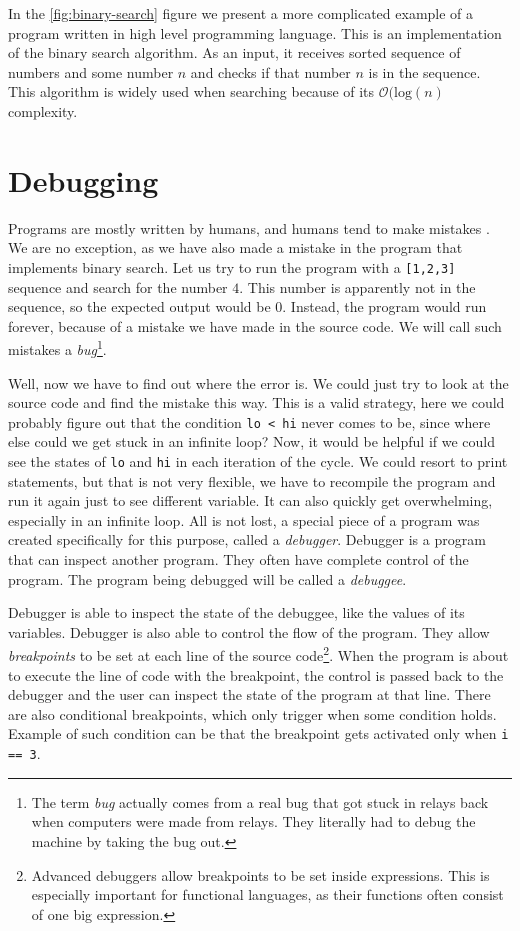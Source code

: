 In the \ref{fig:binary-search} figure we present a more complicated example of
a program written in high level programming language. This is an implementation
of the binary search algorithm. As an input, it receives sorted sequence of
numbers and some number $n$ and checks if that number $n$ is in the sequence.
This algorithm is widely used when searching because of its
$\mathcal{O}(\text{log}(n)$ complexity.

\section{Debugging}
Programs are mostly written by humans, and humans tend to make mistakes
\cite{human-error}. We are no exception, as we have also made a mistake in the
program that implements binary search. Let us try to run the program with a
\texttt{[1,2,3]} sequence and search for the number $4$. This number is
apparently not in the sequence, so the expected output would be $0$. Instead,
the program would run forever, because of a mistake we have made in the source
code. We will call such mistakes a \textit{bug}\footnote{The term \textit{bug}
actually comes from a real bug that got stuck in relays back when computers
were made from relays. They literally had to debug the machine by taking the
bug out.}.

Well, now we have to find out where the error is. We could just try to look at
the source code and find the mistake this way. This is a valid strategy, here
we could probably figure out that the condition \texttt{lo < hi} never comes to
be, since where else could we get stuck in an infinite loop? Now, it would be
helpful if we could see the states of \texttt{lo} and \texttt{hi} in each
iteration of the cycle. We could resort to print statements, but that is not
very flexible, we have to recompile the program and run it again just to see
different variable. It can also quickly get overwhelming, especially in an
infinite loop. All is not lost, a special piece of a program was created
specifically for this purpose, called a \textit{debugger}. Debugger is a
program that can inspect another program. They often have complete control of
the program. The program being debugged will be called a \textit{debuggee}.

Debugger is able to inspect the state of the debuggee, like the values of its
variables. Debugger is also able to control the flow of the program. They allow
\textit{breakpoints} to be set at each line of the source
code\footnote{Advanced debuggers allow breakpoints to be set inside
expressions. This is especially important for functional languages, as their
functions often consist of one big expression.}. When the program is about to
execute the line of code with the breakpoint, the control is passed back to the
debugger and the user can inspect the state of the program at that line. There
are also conditional breakpoints, which only trigger when some condition holds.
Example of such condition can be that the breakpoint gets activated only when
\texttt{i == 3}.

